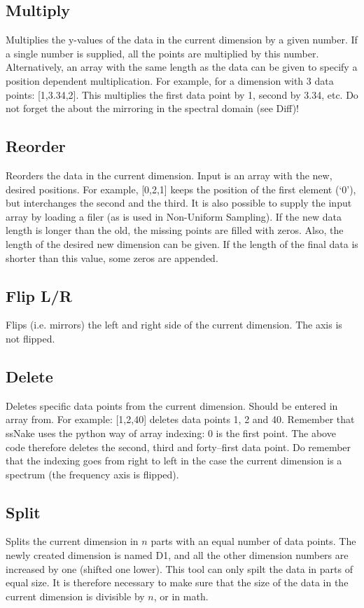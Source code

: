 \documentclass[11pt,a4paper]{article}
\begin{document}
\subsection{Multiply}
Multiplies the y-values of the data in the current dimension by a given number. If a single number is supplied, all the points are multiplied by this number. Alternatively, an array with the same length as the data can be given to specify a position dependent multiplication. For example, for a dimension with 3 data points: [1,3.34,2]. This multiplies the first data point by 1, second by 3.34, etc. Do not forget the about the mirroring in the spectral domain (see Diff)!

\subsection{Reorder}
Reorders the data in the current dimension. Input is an array with the new, desired positions. For example, [0,2,1] keeps the position of the first element (`0'), but interchanges the second and the third. It is also possible to supply the input array by loading a filer (as is used in Non-Uniform Sampling). If the new data length is longer than the old, the missing points are filled with zeros. Also, the length of the desired new dimension can be given. If the length of the final data is shorter than this value, some zeros are appended.

\subsection{Flip L/R}
Flips (i.e. mirrors) the left and right side of the current dimension. The axis is not flipped.

\subsection{Delete}
Deletes specific data points from the current dimension. Should be entered in array from. For example: [1,2,40] deletes data points 1, 2 and 40. Remember that ssNake uses the python way of array indexing: 0 is the first point. The above code therefore deletes the second, third and forty--first data point. Do remember that the indexing goes from right to left in the case the current dimension is a spectrum (the frequency axis is flipped).

\subsection{Split}
Splits the current dimension in $n$ parts with an equal number of data points. The newly created dimension is named D1, and all the other dimension numbers are increased by one (shifted one lower). This tool can only spilt the data in parts of equal size. It is therefore necessary to make sure that the size of the data in the current dimension is divisible by $n$, or in math.
\end{document}
